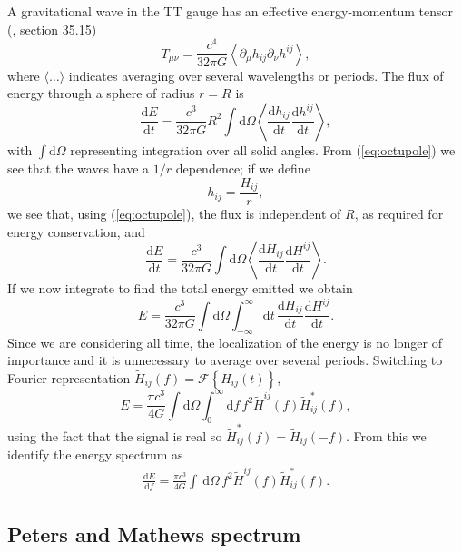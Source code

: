 \documentclass[useAMS,usedcolumn,usegraphicx,usenatbib]{mn2e}
\newcommand{\eqnref}[1]{(\ref{eq:#1})}
\newcommand{\dd}{\ensuremath{\mathrm{d}}}
\newcommand{\diff}[2]{\ensuremath{\frac{\dd {#1}}{\dd {#2}}}}
\newcommand{\intd}[4]{\ensuremath{\int_{#1}^{#2}{#3}\,\dd{#4}}}
\begin{document}
A gravitational wave in the TT gauge has an effective energy-momentum tensor (\citealt{Misner1973}, section 35.15)
\begin{equation}
T_{\mu\nu} = \frac{c^4}{32\pi G}\left\langle\partial_\mu h_{ij} \partial_\nu h^{ij}\right\rangle,
\end{equation}
where $\langle\ldots\rangle$ indicates averaging over several wavelengths or periods. The flux of energy through a sphere of radius $r = R$ is
\begin{equation}
\diff{E}{t} = \frac{c^3}{32\pi G} R^2 \int{\dd\Omega}\left\langle\diff{h_{ij}}{t}\diff{h^{ij}}{t}\right\rangle,
\end{equation}
with $\int{\dd\Omega}$ representing integration over all solid angles. From \eqnref{octupole} we see that the waves have a $1/{r}$ dependence; if we define
\begin{equation}
h_{ij} = \frac{H_{ij}}{r},
\end{equation}
we see that, using \eqnref{octupole}, the flux is independent of $R$, as required for energy conservation, and
\begin{equation}
\diff{E}{t} = \frac{c^3}{32\pi G} \int{\dd\Omega}\left\langle\diff{H_{ij}}{t}\diff{H^{ij}}{t}\right\rangle.
\end{equation}
If we now integrate to find the total energy emitted we obtain
\begin{equation}
E = \frac{c^3}{32\pi G} \int{\dd\Omega}\int_{-\infty}^{\infty}{\dd t} \, \diff{H_{ij}}{t}\diff{H^{ij}}{t}.
\label{eq:integrate_E}
\end{equation}
Since we are considering all time, the localization of the energy is no longer of importance and it is unnecessary to average over several periods. Switching to Fourier representation $\widetilde{H}_{ij}(f) = \mathscr{F}\left\{H_{ij}(t)\right\}$,
\begin{equation}
E = \frac{\pi c^3}{4 G} \int{\dd\Omega}\int_{0}^{\infty}{\dd f} \, f^2 \widetilde{H}^{ij}(f)\widetilde{H}_{ij}^*(f),
\label{eq:total_E}
\end{equation}
using the fact that the signal is real so $\widetilde{H}_{ij}^*(f) = \widetilde{H}_{ij}(-f)$. From this we identify the energy spectrum as
\begin{align}
\diff{E}{f} = \frac{\pi c^3}{4 G} \intd{}{}{}{\Omega} \, f^2 \widetilde{H}^{ij}(f)\widetilde{H}_{ij}^*(f).
\label{eq:NK_dEdf}
\end{align}

\subsection{Peters and Mathews spectrum}
\end{document}
